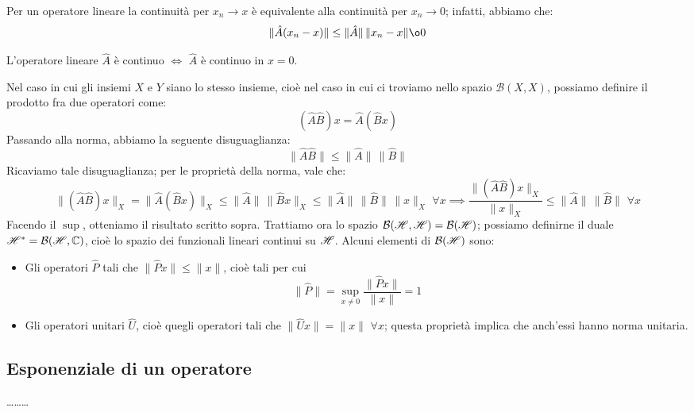 Per un operatore lineare la continuità per $x_n \to x$ è equivalente alla continuità per $x_n \to 0$; infatti, abbiamo che:
$$\|\hat{A}(x_n-x)\| \leq \|\hat{A}\| \, \|x_n-x\| \o 0$$
\begin{teorema}
L'operatore lineare $\hat{A}$ è continuo $\iff$ $\hat{A}$ è continuo in $x=0$.
\end{teorema}
Nel caso in cui gli insiemi $X$ e $Y$ siano lo stesso insieme, cioè nel caso in cui ci troviamo nello spazio $\mathcal{B}(X,X)$, possiamo definire il prodotto fra due operatori come:
$$(\hat{A} \hat{B})x=\hat{A}(\hat{B}x)$$
Passando alla norma, abbiamo la seguente disuguaglianza:
$$\| \hat{A} \hat{B} \| \leq \| \hat{A} \| \, \| \hat{B} \|$$
Ricaviamo tale disuguaglianza; per le proprietà della norma, vale che:
$$\| (\hat{A} \hat{B})x \|_X=\| \hat{A}(\hat{B}x)\|_X \leq \| \hat{A}\| \, \|\hat{B}x\|_X \leq \| \hat{A}\| \, \|\hat{B}\| \, \|x\|_X \, \, \forall x \implies \frac{\| (\hat{A} \hat{B})x \|_X}{\|x\|_X } \leq \| \hat{A}\| \, \|\hat{B}\| \, \, \forall x$$
Facendo il $\sup$, otteniamo il risultato scritto sopra.
\clearpage
Trattiamo ora lo spazio $\mathcal{B}(\mathscr{H}, \mathscr{H})=\mathcal{B}(\mathscr{H})$; possiamo definirne il duale $\mathscr{H}^*=\mathcal{B}(\mathscr{H}, \mathbb{C})$, cioè lo spazio dei funzionali lineari continui su $\mathscr{H}$. Alcuni elementi di $\mathcal{B}(\mathscr{H})$ sono:
\begin{itemize}
\item Gli operatori $\hat{P}$ tali che $\| \hat{P}x \| \leq \|x\|$, cioè tali per cui
$$\| \hat{P} \|= \sup_{x \neq 0} \frac{\| \hat{P}x \|}{\|x\|}=1$$
\item Gli operatori unitari $\hat{U}$, cioè quegli operatori tali che  $\| \hat{U}x \| = \|x\|$ $\forall x$; questa proprietà implica che anch'essi hanno norma unitaria.
\end{itemize}

\subsection{Esponenziale di un operatore}
\dots \dots \dots

